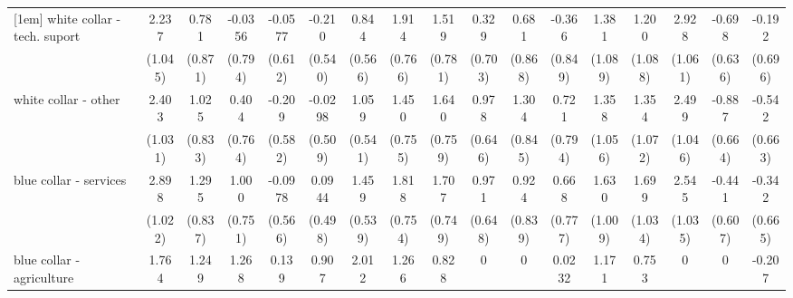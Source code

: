 {\begin{tabular}{l*{16}{c}}
[1em]
white collar - tech. suport&       2.237\sym{*}  &       0.781         &     -0.0356         &     -0.0577         &      -0.210         &       0.844         &       1.914\sym{*}  &       1.519         &       0.329         &       0.681         &      -0.366         &       1.381         &       1.200         &       2.928\sym{**} &      -0.698         &      -0.192         \\
                    &     (1.045)         &     (0.871)         &     (0.794)         &     (0.612)         &     (0.540)         &     (0.566)         &     (0.766)         &     (0.781)         &     (0.703)         &     (0.868)         &     (0.849)         &     (1.089)         &     (1.088)         &     (1.061)         &     (0.636)         &     (0.696)         \\
[1em]
white collar - other&       2.403\sym{*}  &       1.025         &       0.404         &      -0.209         &     -0.0298         &       1.059         &       1.450         &       1.640\sym{*}  &       0.978         &       1.304         &       0.721         &       1.358         &       1.354         &       2.499\sym{*}  &      -0.887         &      -0.542         \\
                    &     (1.031)         &     (0.833)         &     (0.764)         &     (0.582)         &     (0.509)         &     (0.541)         &     (0.755)         &     (0.759)         &     (0.646)         &     (0.845)         &     (0.794)         &     (1.056)         &     (1.072)         &     (1.046)         &     (0.664)         &     (0.663)         \\
[1em]
blue collar - services&       2.898\sym{**} &       1.295         &       1.000         &     -0.0978         &      0.0944         &       1.459\sym{**} &       1.818\sym{*}  &       1.707\sym{*}  &       0.971         &       0.924         &       0.668         &       1.630         &       1.699         &       2.545\sym{*}  &      -0.441         &      -0.342         \\
                    &     (1.022)         &     (0.837)         &     (0.751)         &     (0.566)         &     (0.498)         &     (0.539)         &     (0.754)         &     (0.749)         &     (0.648)         &     (0.839)         &     (0.777)         &     (1.009)         &     (1.034)         &     (1.035)         &     (0.607)         &     (0.665)         \\
[1em]
blue collar - agriculture&       1.764         &       1.249         &       1.268         &       0.139         &       0.907         &       2.012\sym{**} &       1.266         &       0.828         &           0         &           0         &      0.0232         &       1.171         &       0.753         &           0         &           0         &      -0.207         \\

\end{tabular}}
